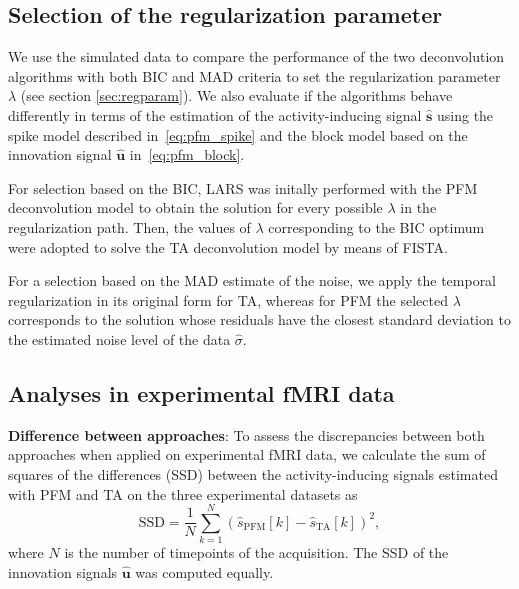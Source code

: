 
\subsection{Selection of the regularization parameter}

We use the simulated data to compare the performance of the two deconvolution algorithms with both BIC and MAD criteria to set the regularization parameter $\lambda$ (see section \ref{sec:regparam}). We also evaluate if the algorithms behave differently in terms of the estimation of the activity-inducing signal $\mathbf{\hat{s}}$ using the spike model described in~\eqref{eq:pfm_spike} and the block model based on the innovation signal $\mathbf{\hat{u}}$ in~\eqref{eq:pfm_block}.

For selection based on the BIC, LARS was initally performed with the PFM deconvolution model to obtain the solution for every possible $\lambda$ in the regularization path. Then, the values of $\lambda$ corresponding to the BIC optimum were adopted to solve the TA deconvolution model by means of FISTA. 

For a selection based on the MAD estimate of the noise, we apply the temporal regularization in its original form for TA, whereas for PFM the selected $\lambda$ corresponds to the solution whose residuals have the closest standard deviation to the estimated noise level of the data $\hat{\sigma}$.  %

\subsection{Analyses in experimental fMRI data}

\textbf{Difference between approaches}: To assess the discrepancies between both approaches when applied on experimental fMRI data, we calculate the sum of squares of the differences (SSD) between the activity-inducing signals estimated with PFM and TA on the three experimental datasets as
\begin{equation}
    \text{SSD} = \frac{1}{N} \sum_{k=1}^N (\hat{s}_\text{PFM}[k] - \hat{s}_\text{TA}[k])^2,
\end{equation}
where $N$ is the number of timepoints of the acquisition. The SSD of the innovation signals $\mathbf{\hat{u}}$ was computed equally.

